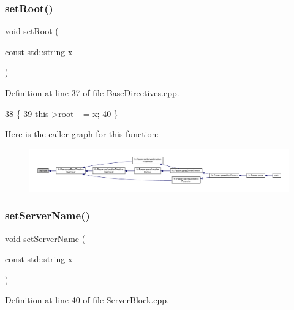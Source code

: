 \subsubsection{\texorpdfstring{set\+Root()}{setRoot()}}
{\footnotesize\ttfamily void set\+Root (\begin{DoxyParamCaption}\item[{const std\+::string}]{x }\end{DoxyParamCaption})\hspace{0.3cm}{\ttfamily [inherited]}}



Definition at line 37 of file Base\+Directives.\+cpp.


\begin{DoxyCode}
38     \{
39         this->\hyperlink{classft_1_1_base_directives_abb1eaf0bba10b90172d6152e69457dc7}{root\_} = x;
40     \}
\end{DoxyCode}
Here is the caller graph for this function\+:
\nopagebreak
\begin{figure}[H]
\begin{center}
\leavevmode
\includegraphics[width=350pt]{classft_1_1_base_directives_a2a7990e309f7e38f2915dbbb0d2704cf_icgraph}
\end{center}
\end{figure}
\mbox{\label{classft_1_1_server_block_a89dfb84333debfc1871f28ef625f9556}} 
\subsubsection{\texorpdfstring{set\+Server\+Name()}{setServerName()}}
{\footnotesize\ttfamily void set\+Server\+Name (\begin{DoxyParamCaption}\item[{const std\+::string}]{x }\end{DoxyParamCaption})}



Definition at line 40 of file Server\+Block.\+cpp.


